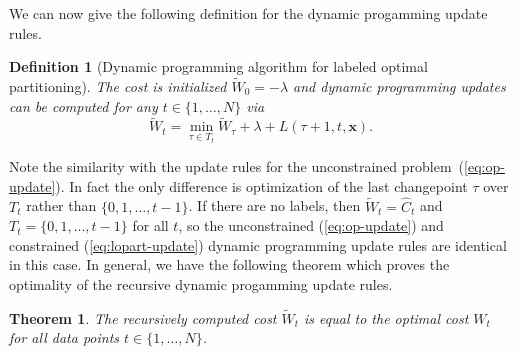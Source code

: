\documentclass[12pt]{article}
\newtheorem{theorem}{Theorem}
\newtheorem{definition}{Definition}
\begin{document}
We can now give the following definition for the dynamic progamming update rules.
\begin{definition}[Dynamic programming algorithm for labeled optimal partitioning]
The cost is initialized $\tilde W_0 = -\lambda$ and dynamic programming updates can be computed for any $t\in\{1, \dots, N\}$ via
\begin{equation}
    \tilde W_t = \min_{\tau \in T_t} \tilde W_\tau + \lambda + L(\tau+1, t, \mathbf x).
    \label{eq:lopart-update}
\end{equation}
\end{definition}
Note the similarity with the update rules for the unconstrained problem~(\ref{eq:op-update}). 
In fact the only difference is optimization of the last changepoint $\tau$ over $T_t$ rather than $\{0, 1, \dots, t-1\}$. 
If there are no labels, then $\tilde W_t=\hat C_t$ and $T_t=\{0, 1, \dots, t-1\}$ for all $t$, so the unconstrained (\ref{eq:op-update}) and constrained (\ref{eq:lopart-update}) dynamic programming update rules are identical in this case. 
In general, we have the following theorem which proves the optimality of the recursive dynamic progamming update rules.
\begin{theorem}
The recursively computed cost $\tilde W_t$ is equal to the optimal cost $W_t$ for all data points $t\in\{1, \dots, N\}$.
\end{theorem}
\end{document}
